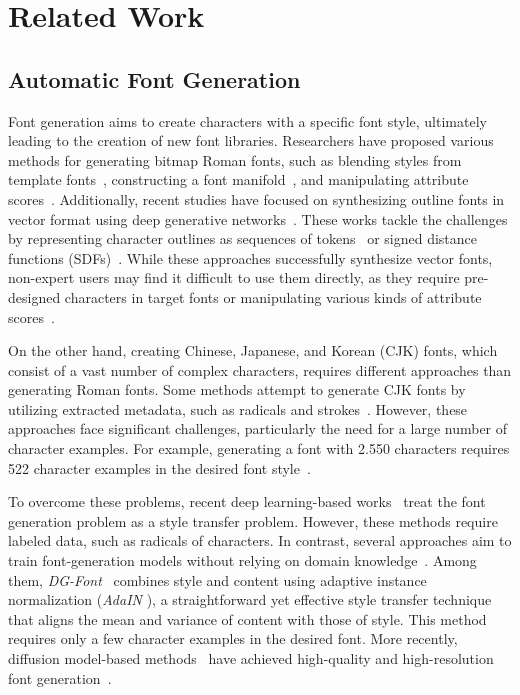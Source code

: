 \section{Related Work}
\subsection{Automatic Font Generation}
Font generation aims to create characters with a specific font style, ultimately leading to the creation of new font libraries.
Researchers have proposed various methods for generating bitmap Roman fonts, such as blending styles from template fonts~\cite{Igarashi2010}, constructing a font manifold~\cite{CampbellFontManifold2014}, and manipulating attribute scores~\cite{wang2020attribute2font}.
Additionally, recent studies have focused on synthesizing outline fonts in vector format using deep generative networks~\cite{liu2023dualvector, xia2023vecfontsdf, wang2021deepvecfont, wang2023deepvecfontv2, thamizharasan2024vecfusion}.
These works tackle the challenges by representing character outlines as sequences of tokens~\cite{wang2021deepvecfont, wang2023deepvecfontv2} or signed distance functions (SDFs)~\cite{liu2023dualvector, xia2023vecfontsdf}.
While these approaches successfully synthesize vector fonts, non-expert users may find it difficult to use them directly, as they require pre-designed characters in target fonts or manipulating various kinds of attribute scores~\cite{wang2020attribute2font}.

On the other hand, creating Chinese, Japanese, and Korean (CJK) fonts, which consist of a vast number of complex characters, requires different approaches than generating Roman fonts.
Some methods attempt to generate CJK fonts by utilizing extracted metadata, such as radicals and strokes~\cite{LianEasyFont2017, SounghuaAutomaticGeneration2009, ZhouEasyGeneration2011, ZongStrokeBank2014}.
However, these approaches face significant challenges, particularly the need for a large number of character examples.
For example, generating a font with \num{2,550} characters requires \num{522} character examples in the desired font style~\cite{LianEasyFont2017}.

To overcome these problems, recent deep learning-based works~\cite{YuchenZi2zi2017,ChaDMFont2020,JiangDCFont2017,ParkMultipleHeads2021,SunSAVAE2018} treat the font generation problem as a style transfer problem.
However, these methods require labeled data, such as radicals of characters.
In contrast, several approaches aim to train font-generation models without relying on domain knowledge~\cite{JiangDCFont2017, XieDGFont2021, ZhangEMD2018, liu2024qtfont, yang2024fontdiffuser}.
Among them, \textit{DG-Font}~\cite{XieDGFont2021} combines style and content using adaptive instance normalization (\textit{AdaIN} \cite{HuangAdaIN2017}), a straightforward yet effective style transfer technique that aligns the mean and variance of content with those of style.
This method requires only a few character examples in the desired font.
More recently, diffusion model-based methods~\cite{ho2020denoising} have achieved high-quality and high-resolution font generation~\cite{liu2024qtfont, yang2024fontdiffuser, he2024difffont, fu2024MSD}.

